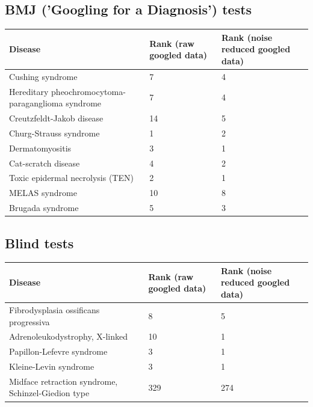 \documentclass[10pt,letterpaper,final]{article}
\begin{document}
\subsection{BMJ ('Googling for a Diagnosis') tests }
\label{app:bmj_raw_reduced}
\begin{center}
\begin{small}
	\begin{tabular}{|p{6cm}|p{2.5cm}|p{2.5cm}|}
	\hline
	\textbf{Disease}  & \textbf{Rank (raw googled data)} & \textbf{Rank (noise reduced googled data)} \\    \hline\hline
    Cushing syndrome  & 7 &  4\\    \hline
    Hereditary pheochromocytoma-paraganglioma syndrome  & 7 & 4\\    \hline
    Creutzfeldt-Jakob disease  & 14 & 5\\    \hline
    Churg-Strauss syndrome  & 1 & 2\\    \hline
    Dermatomyositis  & 3 & 1\\    \hline
    Cat-scratch disease  & 4 & 2\\    \hline
    Toxic epidermal necrolysis (TEN)  & 2 & 1\\    \hline
    MELAS syndrome  & 10 & 8\\    \hline
    Brugada syndrome  & 5 & 3\\    \hline
	\end{tabular}
\end{small}
\end{center}

\subsection{Blind tests}
\label{app:blind_raw_reduced}
\begin{center}
\begin{small}
	\begin{tabular}{|p{6cm}|p{2.5cm}|p{2.5cm}|}
	\hline
	\textbf{Disease}  & \textbf{Rank (raw googled data)} & \textbf{Rank (noise reduced googled data)} \\
	\hline\hline
    Fibrodysplasia ossificans progressiva & 8 & 5\\    \hline
    Adrenoleukodystrophy, X-linked & 10 & 1 \\    \hline
    Papillon-Lefevre syndrome & 3 & 1\\    \hline
    Kleine-Levin syndrome  & 3 & 1\\    \hline
    Midface retraction syndrome, Schinzel-Giedion type  & 329 & 274\\    \hline
	\end{tabular}
\end{small}
\end{center}
\end{document}
